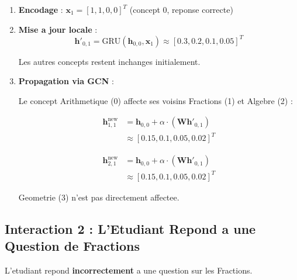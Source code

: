 \documentclass[11pt, a4paper]{article}
\begin{document}
\begin{enumerate}
    \item \textbf{Encodage} : $\mathbf{x}_1 = [1, 1, 0, 0]^T$ (concept 0, reponse correcte)

    \item \textbf{Mise a jour locale} :
          \begin{equation}
              \mathbf{h}'_{0,1} = \text{GRU}(\mathbf{h}_{0,0}, \mathbf{x}_1) \approx [0.3, 0.2, 0.1, 0.05]^T
          \end{equation}

          Les autres concepts restent inchanges initialement.

    \item \textbf{Propagation via GCN} :

          Le concept Arithmetique (0) affecte ses voisins Fractions (1) et Algebre (2) :

          \begin{align}
              \mathbf{h}_{1,1}^{\text{new}} & = \mathbf{h}_{0,0} + \alpha \cdot (\mathbf{W} \mathbf{h}'_{0,1}) \\
                                            & \approx [0.15, 0.1, 0.05, 0.02]^T
          \end{align}

          \begin{align}
              \mathbf{h}_{2,1}^{\text{new}} & = \mathbf{h}_{0,0} + \alpha \cdot (\mathbf{W} \mathbf{h}'_{0,1}) \\
                                            & \approx [0.15, 0.1, 0.05, 0.02]^T
          \end{align}

          Geometrie (3) n'est pas directement affectee.
\end{enumerate}

\subsection{Interaction 2 : L'Etudiant Repond a une Question de Fractions}

L'etudiant repond \textbf{incorrectement} a une question sur les Fractions.
\end{document}
